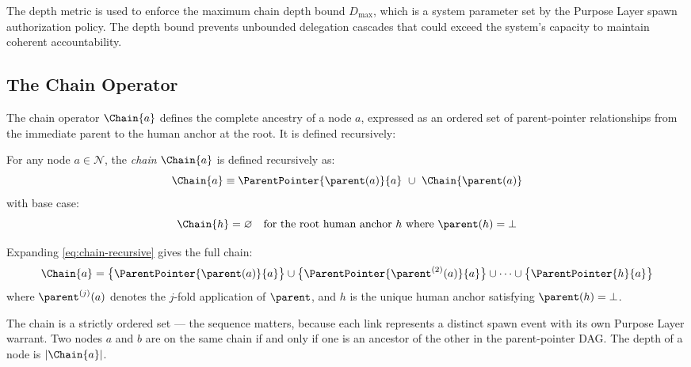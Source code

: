 The depth metric is used to enforce the maximum chain depth bound $D_{\max}$, which is a system parameter set by the Purpose Layer spawn authorization policy. The depth bound prevents unbounded delegation cascades that could exceed the system's capacity to maintain coherent accountability.

\subsection{The Chain Operator}
\label{sec:chain-operator}

The chain operator $\Chain{a}$ defines the complete ancestry of a node $a$, expressed as an ordered set of parent-pointer relationships from the immediate parent to the human anchor at the root. It is defined recursively:

\begin{dfn}
\label{dfn:chain-operator}
For any node $a \in \mathcal{N}$, the \emph{chain} $\Chain{a}$ is defined recursively as:
\begin{equation}
\Chain{a} \equiv \ParentPointer{\parent(a)}{a} \ \cup \ \Chain{\parent(a)}
\label{eq:chain-recursive}
\end{equation}
with base case:
\begin{equation}
\Chain{h} = \varnothing \quad \text{for the root human anchor } h \text{ where } \parent(h) = \bot
\label{eq:chain-base}
\end{equation}
\end{dfn}

Expanding \eqref{eq:chain-recursive} gives the full chain:
\begin{equation}
\Chain{a} = \bigl\{ \ParentPointer{\parent(a)}{a} \bigr\} \cup \bigl\{ \ParentPointer{\parent^{(2)}(a)}{a} \bigr\} \cup \cdots \cup \bigl\{ \ParentPointer{h}{a} \bigr\}
\label{eq:chain-expanded}
\end{equation}
where $\parent^{(j)}(a)$ denotes the $j$-fold application of $\parent$, and $h$ is the unique human anchor satisfying $\parent(h) = \bot$.

The chain is a strictly ordered set — the sequence matters, because each link represents a distinct spawn event with its own Purpose Layer warrant. Two nodes $a$ and $b$ are on the same chain if and only if one is an ancestor of the other in the parent-pointer DAG. The depth of a node is $| \Chain{a} |$.

